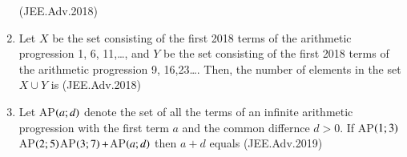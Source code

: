 \documentclass[journal,12pt,twocolumn]{IEEEtran}
\theoremstyle{remark}
\begin{document}
\begin{enumerate}
   \hfill(JEE.Adv.2018)

   \item Let $X$ be the set consisting of the first 2018 terms of the arithmetic progression 1, 6, 11,\dots , and $Y$ be the set consisting of the first 2018 terms of the arithmetic progression 9, 16,23\dots . Then, the number of elements in the set $ X \cup Y $ is \hfill(JEE.Adv.2018)
   \item Let AP$\left(a;d\right)$ denote the set of all the terms of an infinite arithmetic progression with the first term $a$ and the common differnce $d>0$. If AP$\left(1;3\right)$AP$\left(2;5\right)$AP$\left(3;7\right)+$AP$\left(a;d\right)$ then $a + d$ equals \hfill(JEE.Adv.2019)
   
    \end{enumerate}
   
\end{document}
